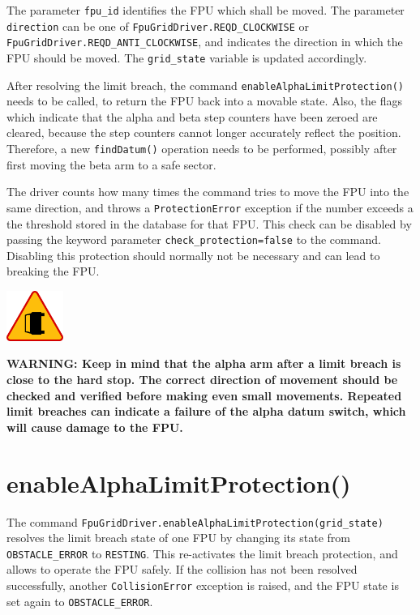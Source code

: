 \documentclass[fontsize=12,a4paper]{scrreprt}
\newenvironment{warning}{\begin{framed}\includegraphics[width=5em]{accident-area-ahead.png}
}{\end{framed}}
\begin{document}
\begin{sloppypar}
The parameter \texttt{fpu\_id} identifies the FPU which shall be
moved. The parameter \texttt{direction} can be one of
\texttt{FpuGridDriver.REQD\_CLOCKWISE} or
\texttt{FpuGridDriver.REQD\_ANTI\_CLOCKWISE}, and indicates the
direction in which the FPU should be moved. The \texttt{grid\_state}
variable is updated accordingly.
\end{sloppypar}

After resolving the limit breach, the command
\texttt{enableAlphaLimitProtection()} needs to be called, to return
the FPU back into a movable state.  Also, the flags which indicate
that the alpha and beta step counters have been zeroed are cleared,
because the step counters cannot longer accurately reflect the
position. Therefore, a new \texttt{findDatum()} operation needs to be
performed, possibly after first moving the beta arm to a safe sector.

The driver counts how many times the command tries to move the FPU
into the same direction, and throws a \texttt{ProtectionError}
exception if the number exceeds a the threshold stored in the database
for that FPU. This check can be disabled by passing the keyword
parameter \texttt{check\_protection=false} to the command. Disabling
this protection should normally not be necessary and can lead to
breaking the FPU.

\begin{warning}
  \textbf{WARNING: Keep in mind that the alpha arm after a limit
    breach is close to the hard stop. The correct direction of
    movement should be checked and verified before making even small
    movements. Repeated limit breaches can indicate a failure of the
    alpha datum switch, which will cause damage to the FPU.}
\end{warning}


\section{enableAlphaLimitProtection()}

The command \texttt{FpuGridDriver.enableAlphaLimitProtection(grid\_state)}
resolves the limit breach state of one FPU by changing
its state from \texttt{OBSTACLE\_ERROR} to \texttt{RESTING}.  This
re-activates the limit breach protection, and allows to operate the
FPU safely. If the collision has not been resolved successfully,
another \texttt{CollisionError} exception is raised, and the FPU state
is set again to \texttt{OBSTACLE\_ERROR}.
\end{document}
